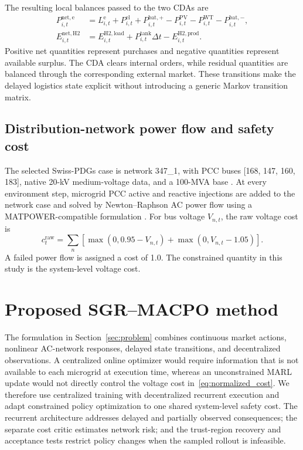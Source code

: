 \documentclass[final,5p,times]{elsarticle}
\begin{document}
The resulting local balances passed to the two CDAs are
\begin{align}
  P_{i,t}^{\mathrm{net,e}} &= L_{i,t}^{\mathrm{e}}+P_{i,t}^{\mathrm{el}}+P_{i,t}^{\mathrm{bat},+}-P_{i,t}^{\mathrm{PV}}-P_{i,t}^{\mathrm{WT}}-P_{i,t}^{\mathrm{bat},-},\label{eq:electric_balance}\\
  E_{i,t}^{\mathrm{net,H2}} &= E_{i,t}^{\mathrm{H2,load}}+P_{i,t}^{\mathrm{tank}}\Delta t-E_{i,t}^{\mathrm{H2,prod}}.\label{eq:h2_balance}
\end{align}
Positive net quantities represent purchases and negative quantities represent available surplus. The CDA clears internal orders, while residual quantities are balanced through the corresponding external market. These transitions make the delayed logistics state explicit without introducing a generic Markov transition matrix.

\subsection{Distribution-network power flow and safety cost}

The selected Swiss-PDGs case is network 347\_1, with PCC buses [168, 147, 160, 183], native 20-kV medium-voltage data, and a 100-MVA base \cite{swisspdgs}. At every environment step, microgrid PCC active and reactive injections are added to the network case and solved by Newton--Raphson AC power flow using a MATPOWER-compatible formulation \cite{zimmerman2011matpower}. For bus voltage $V_{n,t}$, the raw voltage cost is
\begin{equation}
 c_t^{\mathrm{raw}}=\sum_{n}\left[\max(0,0.95-V_{n,t})
 +\max(0,V_{n,t}-1.05)\right].
\end{equation}
A failed power flow is assigned a cost of 1.0. The constrained quantity in this study is the system-level voltage cost.

\section{Proposed SGR--MACPO method}
\label{sec:method}

The formulation in Section~\ref{sec:problem} combines continuous market actions, nonlinear AC-network responses, delayed state transitions, and decentralized observations. A centralized online optimizer would require information that is not available to each microgrid at execution time, whereas an unconstrained MARL update would not directly control the voltage cost in~\eqref{eq:normalized_cost}. We therefore use centralized training with decentralized recurrent execution and adapt constrained policy optimization to one shared system-level safety cost. The recurrent architecture addresses delayed and partially observed consequences; the separate cost critic estimates network risk; and the trust-region recovery and acceptance tests restrict policy changes when the sampled rollout is infeasible.
\end{document}
